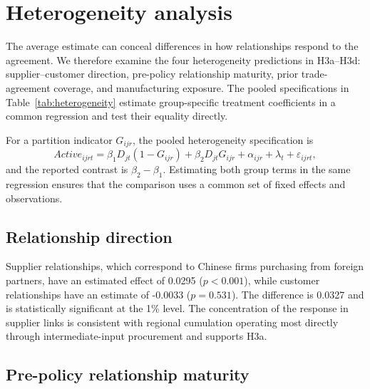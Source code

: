 \documentclass[preprint,12pt,authoryear]{elsarticle}
\begin{document}


\section{Heterogeneity analysis}
\label{sec:heterogeneity}

The average estimate can conceal differences in how relationships respond to the agreement. We therefore examine the four heterogeneity predictions in H3a--H3d: supplier--customer direction, pre-policy relationship maturity, prior trade-agreement coverage, and manufacturing exposure. The pooled specifications in Table~\ref{tab:heterogeneity} estimate group-specific treatment coefficients in a common regression and test their equality directly.

For a partition indicator $G_{ijr}$, the pooled heterogeneity specification is
\begin{equation}
\label{eq:heterogeneity}
Active_{ijrt}
=\beta_1D_{jt}(1-G_{ijr})+\beta_2D_{jt}G_{ijr}
+\alpha_{ijr}+\lambda_t+\varepsilon_{ijrt},
\end{equation}
and the reported contrast is $\beta_2-\beta_1$. Estimating both group terms in
the same regression ensures that the comparison uses a common set of fixed
effects and observations.

\subsection{Relationship direction}

Supplier relationships, which correspond to Chinese firms purchasing from foreign partners, have an estimated effect of 0.0295 ($p<0.001$), while customer relationships have an estimate of -0.0033 ($p=0.531$). The difference is 0.0327 and is statistically significant at the 1\% level. The concentration of the response in supplier links is consistent with regional cumulation operating most directly through intermediate-input procurement and supports H3a.

\subsection{Pre-policy relationship maturity}
\end{document}
